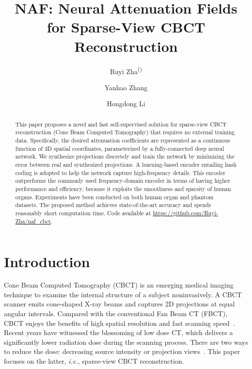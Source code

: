 \documentclass[runningheads]{llncs}
\begin{document}
\title{NAF: Neural Attenuation Fields for Sparse-View CBCT Reconstruction}
\author{Ruyi Zha\textsuperscript{(\Letter)}\and Yanhao Zhang \and Hongdong Li}
\maketitle              \begin{abstract}
This paper proposes a novel and fast self-supervised solution for sparse-view  CBCT reconstruction (Cone Beam Computed Tomography) that requires no external training data. Specifically, the desired attenuation coefficients are represented as a continuous function of 3D spatial coordinates, parameterized by a fully-connected deep neural network. We synthesize projections discretely and train the network by minimizing the error between real and synthesized projections. A learning-based encoder entailing hash coding is adopted to help the network capture high-frequency details. This encoder outperforms the commonly used frequency-domain encoder in terms of having higher performance and efficiency, because it exploits the smoothness and sparsity of human organs. Experiments have been conducted on both human organ and phantom datasets. The proposed method achieves state-of-the-art accuracy and spends reasonably short computation time. Code available at \url{https://github.com/Ruyi-Zha/naf_cbct}.




\end{abstract}

\section{Introduction}
Cone Beam Computed Tomography (CBCT) is an emerging medical imaging technique to examine the internal structure of a subject noninvasively. A CBCT scanner emits cone-shaped X-ray beams and captures 2D projections at equal angular intervals. Compared with the conventional Fan Beam CT (FBCT), CBCT enjoys the benefits of high spatial resolution and fast scanning speed~\cite{scarfe2006clinical}. Recent years have witnessed the blossoming of low dose CT, which delivers a significantly lower radiation dose during the scanning process. There are two ways to reduce the dose: decreasing source intensity or projection views~\cite{gao2014low}. This paper focuses on the latter,  \textit{i.e.}, sparse-view CBCT reconstruction. 
\end{document}
